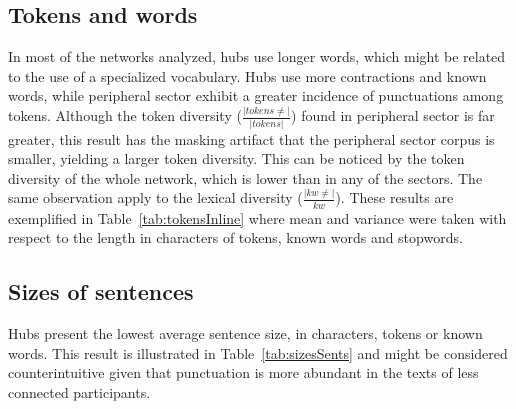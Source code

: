 \subsection{Tokens and words}\label{subsec:tw}
%

In most of the networks analyzed, hubs use longer words, which might be related to the use of a specialized vocabulary.
Hubs use more contractions and known words, while peripheral sector exhibit a greater incidence of punctuations among tokens.
Although the token diversity ($\frac{|tokens \neq|}{|tokens|}$) found in peripheral sector is far greater,
this result has the masking artifact that the peripheral sector corpus is smaller, yielding a larger token diversity.
This can be noticed by the token diversity of the whole network, which is lower than in any of the sectors.
The same observation apply to the lexical diversity ($\frac{|kw\neq|}{kw}$).
These results are exemplified in Table~\ref{tab:tokensInline}
where mean and variance were taken with respect to the length in characters of tokens, known words and stopwords.

\FloatBarrier



%

\subsection{Sizes of sentences}\label{subsec:ss}
Hubs present the lowest average sentence size,
in characters, tokens or known words.
This result is illustrated in Table~\ref{tab:sizesSents}
and might be considered counterintuitive given that punctuation
is more abundant in the texts of less connected participants.

\FloatBarrier

